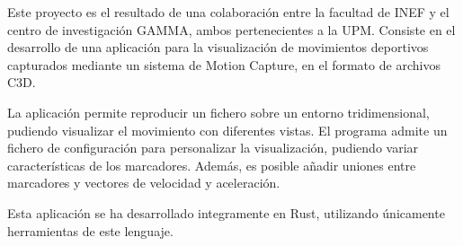 Este proyecto es el resultado de una colaboración entre la facultad de INEF y el centro de investigación GAMMA, ambos pertenecientes a la UPM. Consiste en el desarrollo de una aplicación para la visualización de movimientos deportivos capturados mediante un sistema de Motion Capture, en el formato de archivos C3D. 

La aplicación permite reproducir un fichero sobre un entorno tridimensional, pudiendo visualizar el movimiento con diferentes vistas. El programa admite un fichero de configuración para personalizar la visualización, pudiendo variar características de los marcadores. Además, es posible añadir uniones entre marcadores y vectores de velocidad y aceleración. 

Esta aplicación se ha desarrollado integramente en Rust, utilizando únicamente herramientas de este lenguaje.